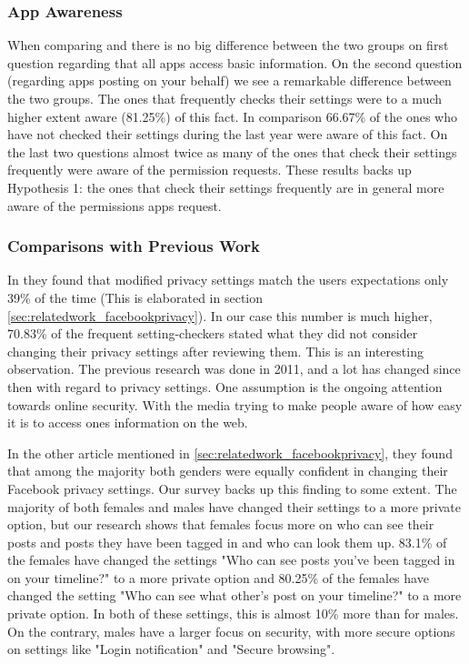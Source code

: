 \subsubsection{App Awareness}
When comparing  and  there is no big difference between the two groups on first question regarding that all apps access basic information. On the second question (regarding apps posting on your behalf) we see a remarkable difference between the two groups. The ones that frequently checks their settings were to a much higher extent aware (81.25\%) of this fact. In comparison 66.67\% of the ones who have not checked their settings during the last year were aware of this fact. On the last two questions almost twice as many of the ones that check their settings frequently were aware of the permission requests. These results backs up Hypothesis 1: the ones that check their settings frequently are in general more aware of the permissions apps request.

\subsubsection{Comparisons with Previous Work} 
In \cite{expectations} they found that modified privacy settings match the users expectations only 39\% of the time (This is elaborated in section \ref{sec:relatedwork_facebookprivacy}). In our case this number is much higher, 70.83\% of the frequent setting-checkers stated what they did not consider changing their privacy settings after reviewing them. This is an interesting observation. The previous research was done in 2011, and a lot has changed since then with regard to privacy settings. One assumption is the ongoing attention towards online security. With the media trying to make people aware of how easy it is to access ones information on the web. 

In the other article \cite{whocares} mentioned in \ref{sec:relatedwork_facebookprivacy}, they found that among the majority both genders were equally confident in changing their Facebook privacy settings. Our survey backs up this finding to some extent. The majority of both females and males have changed their settings to a more private option, but our research shows that females focus more on who can see their posts and posts they have been tagged in and who can look them up. 83.1\% of the females have changed the settings "Who can see posts you've been tagged in on your timeline?" to a more private option and 80.25\% of the females have changed the setting "Who can see what other's post on your timeline?" to a more private option. In both of these settings, this is almost 10\% more than for males. On the contrary, males have a larger focus on security, with more secure options on settings like "Login notification" and "Secure browsing". 






















